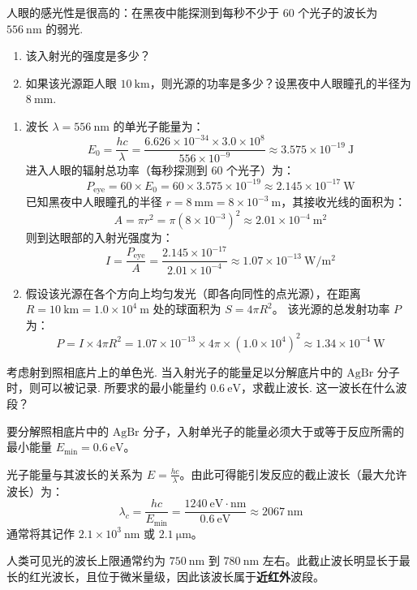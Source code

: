 \begin{exercise}\label{ex:22.6}
人眼的感光性是很高的：在黑夜中能探测到每秒不少于 $60$ 个光子的波长为 $556 \ \mathrm{nm}$ 的弱光. 
\begin{enumerate}
  \item[(a)] 该入射光的强度是多少？
  \item[(b)] 如果该光源距人眼 $10 \ \mathrm{km}$，则光源的功率是多少？设黑夜中人眼瞳孔的半径为 $8 \ \mathrm{mm}$.
\end{enumerate}
\end{exercise}
\begin{solution}
\begin{enumerate}
    \item[(a)] 波长 $\lambda = 556 \ \mathrm{nm}$ 的单光子能量为：
    $$ E_0 = \frac{hc}{\lambda} = \frac{6.626 \times 10^{-34} \times 3.0 \times 10^8}{556 \times 10^{-9}} \approx 3.575 \times 10^{-19} \ \mathrm{J} $$
    进入人眼的辐射总功率（每秒探测到 60 个光子）为：
    $$ P_{\text{eye}} = 60 \times E_0 = 60 \times 3.575 \times 10^{-19} \approx 2.145 \times 10^{-17} \ \mathrm{W} $$
    已知黑夜中人眼瞳孔的半径 $r = 8 \ \mathrm{mm} = 8 \times 10^{-3} \ \mathrm{m}$，其接收光线的面积为：
    $$ A = \pi r^2 = \pi (8 \times 10^{-3})^2 \approx 2.01 \times 10^{-4} \ \mathrm{m^2} $$
    则到达眼部的入射光强度为：
    $$ I = \frac{P_{\text{eye}}}{A} = \frac{2.145 \times 10^{-17}}{2.01 \times 10^{-4}} \approx 1.07 \times 10^{-13} \ \mathrm{W/m^2} $$
    
    \item[(b)] 假设该光源在各个方向上均匀发光（即各向同性的点光源），在距离 $R = 10 \ \mathrm{km} = 1.0 \times 10^4 \ \mathrm{m}$ 处的球面积为 $S = 4\pi R^2$。
    该光源的总发射功率 $P$ 为：
    $$ P = I \times 4\pi R^2 = 1.07 \times 10^{-13} \times 4\pi \times (1.0 \times 10^4)^2 \approx 1.34 \times 10^{-4} \ \mathrm{W} $$
\end{enumerate}
\end{solution}

\begin{exercise}\label{ex:22.7}
考虑射到照相底片上的单色光. 当入射光子的能量足以分解底片中的 $\mathrm{AgBr}$ 分子时，则可以被记录. 所要求的最小能量约 $0.6 \ \mathrm{eV}$，求截止波长. 这一波长在什么波段？
\end{exercise}
\begin{solution}
要分解照相底片中的 $\mathrm{AgBr}$ 分子，入射单光子的能量必须大于或等于反应所需的最小能量 $E_{\min} = 0.6 \ \mathrm{eV}$。

光子能量与其波长的关系为 $E = \frac{hc}{\lambda}$。由此可得能引发反应的截止波长（最大允许波长）为：
$$ \lambda_c = \frac{hc}{E_{\min}} = \frac{1240 \ \mathrm{eV \cdot nm}}{0.6 \ \mathrm{eV}} \approx 2067 \ \mathrm{nm} $$
通常将其记作 $2.1 \times 10^3 \ \mathrm{nm}$ 或 $2.1 \ \mathrm{\mu m}$。

人类可见光的波长上限通常约为 $750 \ \mathrm{nm}$ 到 $780 \ \mathrm{nm}$ 左右。此截止波长明显长于最长的红光波长，且位于微米量级，因此该波长属于\textbf{近红外}波段。
\end{solution}

